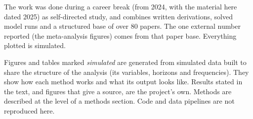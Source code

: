 \documentclass[
  british,
  a4paper,
]{article}
\begin{document}
The work was done during a career break (from 2024, with the material
here dated 2025) as self-directed study, and combines written
derivations, solved model runs and a structured base of over 80 papers.
The one external number reported (the meta-analysis figures) comes from
that paper base. Everything plotted is simulated.

Figures and tables marked \emph{simulated} are generated from simulated
data built to share the structure of the analysis (its variables,
horizons and frequencies). They show how each method works and what its
output looks like. Results stated in the text, and figures that give a
source, are the project's own. Methods are described at the level of a
methods section. Code and data pipelines are not reproduced here.
\end{document}
